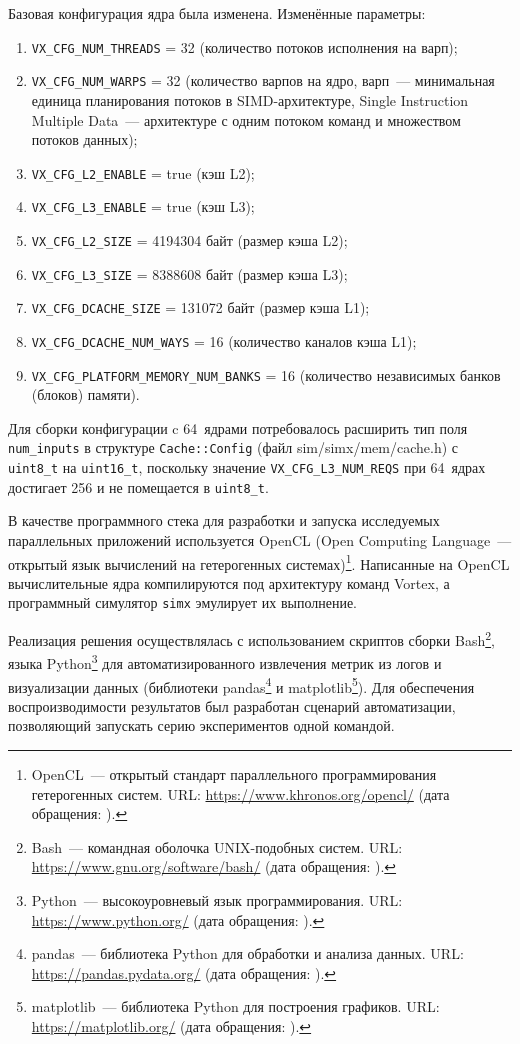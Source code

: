 \documentclass[a4paper]{article}
\begin{document}
Базовая конфигурация ядра была изменена. Изменённые параметры:
\begin{enumerate}
    \item \texttt{VX\_CFG\_NUM\_THREADS} = 32 (количество потоков исполнения на варп);
    \item \texttt{VX\_CFG\_NUM\_WARPS} = 32 (количество варпов на ядро, варп~--- минимальная единица планирования потоков в SIMD-архитектуре, Single Instruction Multiple Data~--- архитектуре с одним потоком команд и множеством потоков данных);
    \item \texttt{VX\_CFG\_L2\_ENABLE} = true (кэш L2);
    \item \texttt{VX\_CFG\_L3\_ENABLE} = true (кэш L3);
    \item \texttt{VX\_CFG\_L2\_SIZE} = 4194304 байт (размер кэша L2);
    \item \texttt{VX\_CFG\_L3\_SIZE} = 8388608 байт (размер кэша L3);
    \item \texttt{VX\_CFG\_DCACHE\_SIZE} = 131072 байт (размер кэша L1);
    \item \texttt{VX\_CFG\_DCACHE\_NUM\_WAYS} = 16 (количество каналов кэша L1);
    \item \texttt{VX\_CFG\_PLATFORM\_MEMORY\_NUM\_BANKS} = 16 (количество независимых банков (блоков) памяти).
\end{enumerate}

Для сборки конфигурации c 64~ядрами потребовалось расширить тип поля \texttt{num\_inputs} в структуре \texttt{Cache::Config} (файл sim/simx/mem/cache.h) с \texttt{uint8\_t} на \texttt{uint16\_t}, поскольку значение \texttt{VX\_CFG\_L3\_NUM\_REQS} при 64~ядрах достигает 256 и не помещается в \texttt{uint8\_t}. 

В качестве программного стека для разработки и запуска исследуемых параллельных приложений используется OpenCL (Open Computing Language~--- открытый язык вычислений на гетерогенных системах)\footnote{OpenCL~--- открытый стандарт параллельного программирования гетерогенных систем. URL: \url{https://www.khronos.org/opencl/} (дата обращения: ).}. Написанные на OpenCL вычислительные ядра компилируются под архитектуру команд Vortex, а программный симулятор \texttt{simx} эмулирует их выполнение.


Реализация решения осуществлялась с использованием скриптов сборки Bash\footnote{Bash~--- командная оболочка UNIX-подобных систем. URL: \url{https://www.gnu.org/software/bash/} (дата обращения: ).}, языка Python\footnote{Python~--- высокоуровневый язык программирования. URL: \url{https://www.python.org/} (дата обращения: ).} для автоматизированного извлечения метрик из логов и визуализации данных (библиотеки pandas\footnote{pandas~--- библиотека Python для обработки и анализа данных. URL: \url{https://pandas.pydata.org/} (дата обращения: ).} и matplotlib\footnote{matplotlib~--- библиотека Python для построения графиков. URL: \url{https://matplotlib.org/} (дата обращения: ).}). Для обеспечения воспроизводимости результатов был разработан сценарий автоматизации, позволяющий запускать серию экспериментов одной командой.
\end{document}
